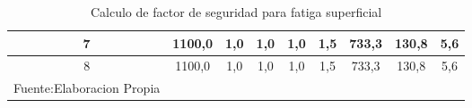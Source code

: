 \begin{longtable}{|c|c|c|c|c|c|c|c|c|}
7          & 1100,0                                                      & 1,0 & 1,0 & 1,0    & 1,5 & 733,3                                                                                & 130,8                                                                       & 5,6 \\ \hline
8          & 1100,0                                                      & 1,0 & 1,0 & 1,0    & 1,5 & 733,3                                                                                & 130,8                                                                       & 5,6 \\ \hline

\caption{Calculo de factor de seguridad para fatiga superficial}{Fuente:Elaboracion Propia}
\label{table:fatiga_Superficial2}
\end{longtable}

